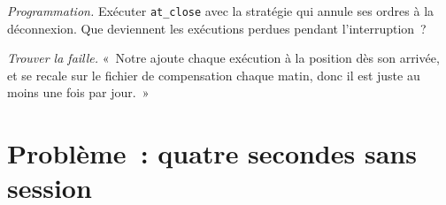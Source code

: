 \begin{exercise}[$\star\star\star$]\label{exo:pl:position-and-pnl-services:7}
\emph{Programmation.} Exécuter \texttt{at\_close} avec la stratégie qui annule ses ordres à la déconnexion. Que deviennent les exécutions perdues pendant l'interruption~?
\end{exercise}

\begin{exercise}[$\star\star\star$]\label{exo:pl:position-and-pnl-services:8}
\emph{Trouver la faille.} «~Notre  ajoute chaque exécution à la position dès son arrivée, et se recale sur le fichier de compensation chaque matin, donc
il est juste au moins une fois par jour.~»
\end{exercise}

\section{Problème~: quatre secondes sans session}

